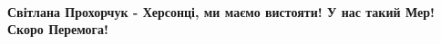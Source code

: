  
 
 
 
 

\paragraph{Світлана Прохорчук - Херсонці, ми маємо вистояти! У нас такий Мер! Скоро Перемога!}
\label{sec:22_04_2022.fb.kolyhaev_igor.herson.mer.1.herson.cmt.prohorchuk.peremoga}

